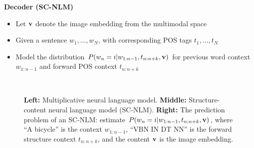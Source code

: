 \documentclass[serif,mathserif,final]{beamer}
\begin{document}
\begin{frame}{}
\begin{columns}[t]
\begin{column}{0.32\linewidth}
\vfill
\begin{block}{\bf{\large Decoder (SC-NLM)}}  
  \begin{itemize}
  \item Let ${\bf v}$ denote the image embedding from the multimodal space
  \item Given a sentence $w_1, \ldots, w_N$, 
    with corresponding POS tags $t_1, \ldots, t_N$
  \item Model the distribution $P(w_n = i | w_{1:n-1}, t_{n:n+k}, 
  {\bf v})$ for previous word context $w_{1:n-1}$ 
  and forward POS context $t_{n:n+k}$
  \end{itemize}
  \begin{figure}
    \centering
    \mbox{
      \hspace{5mm}
      \quad
      \hspace{2mm}
    }

    \caption{{\bf Left:} Multiplicative neural language model. {\bf Middle:}
      Structure-content neural language model (SC-NLM). {\bf Right:} The
      prediction problem of an SC-NLM: estimate 
      $P(w_n = i | w_{1:n-1}, t_{n:n+k}, {\bf v})$, where ``A bicycle'' is the context 
      $w_{1:n-1}$, ``VBN IN DT NN'' is the forward structure context
      $t_{n:n+k}$, and the content ${\bf v}$ is the image embedding.}
    \label{fig:nlms}
  \end{figure}
\end{block}
\vfill


\end{column}
\end{columns}
\end{frame}
\end{document}
